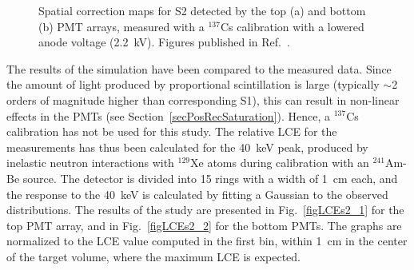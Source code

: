\begin{figure}[!b]
\centering
{}
\caption[Spatial correction maps for S2 detected by the top and bottom PMT arrays]{Spatial correction maps for S2 detected by the top (a) and bottom (b) PMT arrays, measured with a $^{137}$Cs calibration with a lowered anode voltage (2.2~kV). Figures published in Ref.~\cite{xe100-instrument}. }
\label{figCorrectionMapS2}
\end{figure}

The results of the simulation have been compared to the measured data. Since the amount of light produced  by proportional scintillation is large (typically $\sim$2 orders of magnitude higher than corresponding S1), this can result in non-linear effects in the PMTs (see Section~\ref{secPosRecSaturation}). Hence, a $^{137}$Cs calibration has not be used for this study. The relative LCE for the measurements has thus been calculated for the 40~keV peak, produced by inelastic neutron interactions with $^{129}$Xe atoms during calibration with an $^{241}$Am-Be source. The detector is divided into 15 rings with a width of 1~cm each, and the response to the 40~keV is calculated by fitting a Gaussian to the observed distributions. The results of the study are presented in Fig.~\ref{figLCEs2_1} for the top PMT array, and in Fig.~\ref{figLCEs2_2} for the bottom PMTs. The graphs are normalized to the LCE value computed in the first bin, within 1~cm in the center of the target volume, where the maximum LCE is expected.

